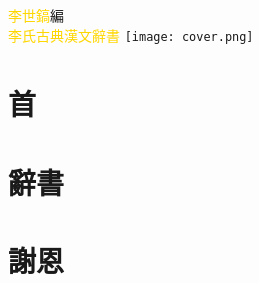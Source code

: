 \documentclass[a5paper,11pt]{report}
\begin{document}
\begin{titlepage}
\doublespacing
\hfill
\vfill
{\textcolor{gold}{李世鎬}\hspace{14pt}編}\\
{\huge\textcolor{gold}{李氏古典漢文辭書}}
\vfill
\hspace{-40mm}
\texttt{[image: cover.png]}
\vspace{64pt}
\end{titlepage}
\newpage
\chapter*{首}
\doublespacing


\chapter*{辭書}
\begin{multicols}{2}
\begin{flushleft}
\onehalfspacing

\end{flushleft}
\end{multicols}

\chapter*{謝恩}
\doublespacing

\end{document}
